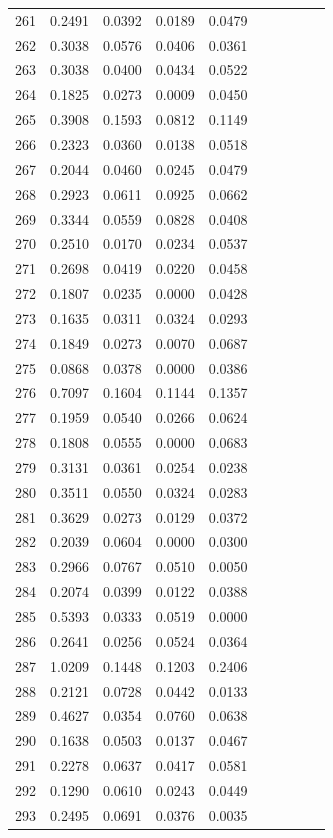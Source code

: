 \begin{table}
\begin{tabular}{cccccccccc}
261& 0.2491& 0.0392& 0.0189& 0.0479\\ 
262& 0.3038& 0.0576& 0.0406& 0.0361\\ 
263& 0.3038& 0.0400& 0.0434& 0.0522\\ 
264& 0.1825& 0.0273& 0.0009& 0.0450\\ 
265& 0.3908& 0.1593& 0.0812& 0.1149\\ 
266& 0.2323& 0.0360& 0.0138& 0.0518\\ 
267& 0.2044& 0.0460& 0.0245& 0.0479\\ 
268& 0.2923& 0.0611& 0.0925& 0.0662\\ 
269& 0.3344& 0.0559& 0.0828& 0.0408\\ 
270& 0.2510& 0.0170& 0.0234& 0.0537\\ 
271& 0.2698& 0.0419& 0.0220& 0.0458\\ 
272& 0.1807& 0.0235& 0.0000& 0.0428\\ 
273& 0.1635& 0.0311& 0.0324& 0.0293\\ 
274& 0.1849& 0.0273& 0.0070& 0.0687\\ 
275& 0.0868& 0.0378& 0.0000& 0.0386\\ 
276& 0.7097& 0.1604& 0.1144& 0.1357\\ 
277& 0.1959& 0.0540& 0.0266& 0.0624\\ 
278& 0.1808& 0.0555& 0.0000& 0.0683\\ 
279& 0.3131& 0.0361& 0.0254& 0.0238\\ 
280& 0.3511& 0.0550& 0.0324& 0.0283\\ 
281& 0.3629& 0.0273& 0.0129& 0.0372\\ 
282& 0.2039& 0.0604& 0.0000& 0.0300\\ 
283& 0.2966& 0.0767& 0.0510& 0.0050\\ 
284& 0.2074& 0.0399& 0.0122& 0.0388\\ 
285& 0.5393& 0.0333& 0.0519& 0.0000\\ 
286& 0.2641& 0.0256& 0.0524& 0.0364\\ 
287& 1.0209& 0.1448& 0.1203& 0.2406\\ 
288& 0.2121& 0.0728& 0.0442& 0.0133\\ 
289& 0.4627& 0.0354& 0.0760& 0.0638\\ 
290& 0.1638& 0.0503& 0.0137& 0.0467\\ 
291& 0.2278& 0.0637& 0.0417& 0.0581\\ 
292& 0.1290& 0.0610& 0.0243& 0.0449\\ 
293& 0.2495& 0.0691& 0.0376& 0.0035\\ 

\end{tabular}
\end{table}
